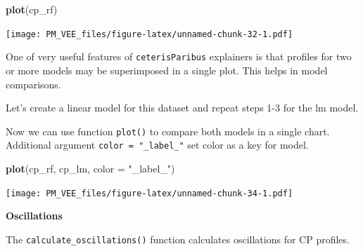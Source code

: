 \documentclass[]{krantz}
\newenvironment{Shaded}{\begin{snugshade}}{\end{snugshade}}
\newcommand{\DataTypeTok}[1]{\textcolor[rgb]{0.13,0.29,0.53}{#1}}
\newcommand{\KeywordTok}[1]{\textcolor[rgb]{0.13,0.29,0.53}{\textbf{#1}}}
\newcommand{\NormalTok}[1]{#1}
\newcommand{\OperatorTok}[1]{\textcolor[rgb]{0.81,0.36,0.00}{\textbf{#1}}}
\newcommand{\StringTok}[1]{\textcolor[rgb]{0.31,0.60,0.02}{#1}}
\theoremstyle{definition}
\theoremstyle{definition}
\theoremstyle{definition}
\theoremstyle{remark}
\begin{document}
\begin{Shaded}
\begin{Highlighting}[]
\KeywordTok{plot}\NormalTok{(cp_rf) }
\end{Highlighting}
\end{Shaded}

\texttt{[image: PM\_VEE\_files/figure-latex/unnamed-chunk-32-1.pdf]}

One of very useful features of \texttt{ceterisParibus} explainers is
that profiles for two or more models may be superimposed in a single
plot. This helps in model comparisons.

Let's create a linear model for this dataset and repeat steps 1-3 for
the lm model.

\begin{Shaded}
\end{Shaded}

Now we can use function \texttt{plot()} to compare both models in a
single chart. Additional argument \texttt{color\ =\ "\_label\_"} set
color as a key for model.

\begin{Shaded}
\begin{Highlighting}[]
\KeywordTok{plot}\NormalTok{(cp_rf, cp_lm, }\DataTypeTok{color =} \StringTok{"_label_"}\NormalTok{)}
\end{Highlighting}
\end{Shaded}

\texttt{[image: PM\_VEE\_files/figure-latex/unnamed-chunk-34-1.pdf]}

\textbf{Oscillations}

The \texttt{calculate\_oscillations()} function calculates oscillations
for CP profiles.
\end{document}
